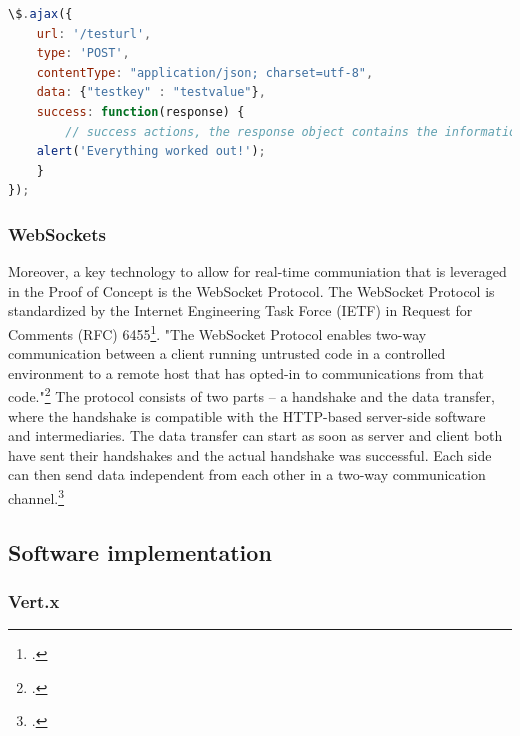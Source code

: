 \begin{lstlisting}[language=javascript,caption={Exemplary jQuery AJAX call},label={lst:jqueryajaxcall}]
\$.ajax({
    url: '/testurl',
    type: 'POST',
    contentType: "application/json; charset=utf-8",
    data: {"testkey" : "testvalue"},
    success: function(response) {
        // success actions, the response object contains the information sent from the server
	alert('Everything worked out!');
    }
});
\end{lstlisting}

\subsubsection{WebSockets}
Moreover, a key technology to allow for real-time communiation that is leveraged
in the Proof of Concept is the WebSocket Protocol. The WebSocket Protocol is standardized
by the Internet Engineering Task Force (IETF) in Request for Comments (RFC)
6455\footcite[Cf.][]{rfc6455}. "The WebSocket Protocol enables two-way
communication between a client running untrusted code in a controlled
environment to a remote host that has opted-in to communications from that
code."\footcite[.][]{rfc6455} The protocol consists of two parts – a handshake
and the data transfer, where the handshake is compatible with the HTTP-based
server-side software and intermediaries. The data transfer can start as
soon as server and client both have sent their handshakes and the actual
handshake was successful. Each side can then send data independent from each
other in a two-way communication channel.\footcite[Cf.][]{rfc6455}



\FloatBarrier
\subsection{Software implementation}
\label{software_implementation}

\subsubsection{Vert.x}
\label{implementation_vertx}

